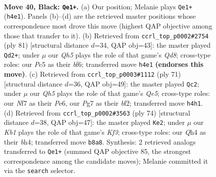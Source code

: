 \documentclass[11pt]{article}
\begin{document}
\clearpage

\begin{figure}[p]\centering
\begin{subfigure}{0.46\textwidth}\centering
\resizebox{\linewidth}{!}{%
\newchessgame
\chessboard[
  setfen={1k6/p1pQ1npp/1p2p3/2p3P1/7q/2P5/1P6/K7 b - - 1 40},
  showmover=false,
  pgfstyle=straightmove, color=movearrow, markmove={h4-e1}
]}
\caption{}
\end{subfigure}\hfill
\begin{subfigure}{0.46\textwidth}\centering
\resizebox{\linewidth}{!}{%
\newchessgame
\chessboard[
  setfen={4Q3/5p1k/p1n2Bp1/1p4Pp/8/3P3P/5K2/3q4 b - - 7 41},
  showmover=false,
  pgfstyle=straightmove, color=movearrow, markmove={d1-d2}
]}
\caption{}
\end{subfigure}
\\[4pt]
\begin{subfigure}{0.46\textwidth}\centering
\resizebox{\linewidth}{!}{%
\newchessgame
\chessboard[
  setfen={6k1/3Q1p2/4p2p/3pP1p1/1p2q3/6PP/1P3B1K/8 b - - 1 36},
  showmover=false,
  pgfstyle=straightmove, color=movearrow, markmove={e4-c2}
]}
\caption{}
\end{subfigure}\hfill
\begin{subfigure}{0.46\textwidth}\centering
\resizebox{\linewidth}{!}{%
\newchessgame
\chessboard[
  setfen={5k2/5p2/p5pp/1pN5/1P1P3b/P3PK1P/Q5P1/2q5 w - - 6 38},
  showmover=false,
  pgfstyle=straightmove, color=movearrow, markmove={f3-e2}
]}
\caption{}
\end{subfigure}
\caption{\textbf{Move 40, Black: \texttt{Qe1+}.} (a) Our position; Melanie plays \texttt{Qe1+} (\texttt{h4e1}). Panels (b)--(d) are the retrieved master positions whose correspondence most drove this move (highest QAP objective among those that transfer to it). (b) Retrieved from \texttt{ccrl\_top\_p0002\#2754} (ply 81) [structural distance $d$=34, QAP obj=43]: the master played \texttt{Qd2+}; under $\mu$ our \emph{Qh5} plays the role of that game's \emph{Qd8}; cross-type roles: our \emph{P}c5 as their \emph{b}f6; transferred move \texttt{h4e1} \textbf{(endorses this move)}. (c) Retrieved from \texttt{ccrl\_top\_p0003\#1112} (ply 71) [structural distance $d$=36, QAP obj=49]: the master played \texttt{Qc2}; under $\mu$ our \emph{Qh5} plays the role of that game's \emph{Qe5}; cross-type roles: our \emph{N}f7 as their \emph{P}e6, our \emph{P}g7 as their \emph{b}f2; transferred move \texttt{h4h1}. (d) Retrieved from \texttt{ccrl\_top\_p0002\#3563} (ply 74) [structural distance $d$=38, QAP obj=47]: the master played \texttt{Ke2}; under $\mu$ our \emph{Kb1} plays the role of that game's \emph{Kf3}; cross-type roles: our \emph{Q}h4 as their \emph{b}h4; transferred move \texttt{b8a8}. Synthesis: 2 retrieved analogs transferred to \texttt{Qe1+} (summed QAP objective 85, the strongest correspondence among the candidate moves); Melanie committed it via the \texttt{search} selector.}
\label{fig:thought-m79}
\end{figure}
\end{document}

